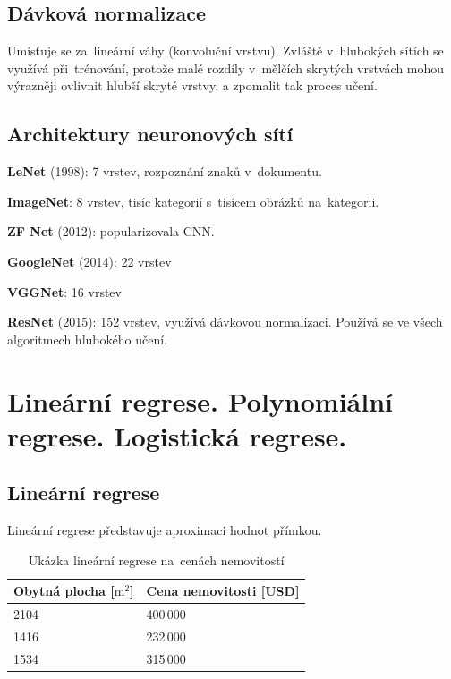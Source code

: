 \subsection{Dávková normalizace}

Umisťuje se za~lineární váhy (konvoluční vrstvu).
Zvláště v~hlubokých sítích se využívá při~trénování, protože malé rozdíly v~mělčích skrytých vrstvách mohou výrazněji ovlivnit hlubší skryté vrstvy, a zpomalit tak proces učení.

\subsection{Architektury neuronových sítí}


\textbf{LeNet} (1998): 7 vrstev, rozpoznání znaků v~dokumentu.

\textbf{ImageNet}: 8 vrstev, tisíc kategorií s~tisícem obrázků na~kategorii.

\textbf{ZF Net} (2012): popularizovala CNN.

\textbf{GoogleNet} (2014): 22 vrstev

\textbf{VGGNet}: 16 vrstev

\textbf{ResNet} (2015): 152 vrstev, využívá dávkovou normalizaci. Používá se ve všech algoritmech hlubokého učení.

\clearpage
\section{Lineární regrese. Polynomiální regrese. Logistická regrese.}

\subsection{Lineární regrese}

Lineární regrese představuje aproximaci hodnot přímkou.

\begin{table}[h]
	\centering
	\begin{tabular}{ |l|l| }
    Obytná plocha [$\text{m}^2$] & Cena nemovitosti [USD] \\ \hline \hline
    2104 & 400\,000 \\ \hline
    1416 & 232\,000 \\ \hline
    1534 & 315\,000 \\ \hline
	\end{tabular}
	\caption{Ukázka lineární regrese na~cenách nemovitostí}
    \label{tabulka-linearni-regrese}
\end{table}

